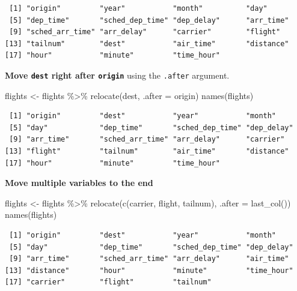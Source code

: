 \documentclass[
  letterpaper,
  DIV=11,
  numbers=noendperiod,
  oneside]{scrreprt}
\newenvironment{Shaded}{\begin{snugshade}}{\end{snugshade}}
\newcommand{\AttributeTok}[1]{\textcolor[rgb]{0.40,0.45,0.13}{#1}}
\newcommand{\FunctionTok}[1]{\textcolor[rgb]{0.28,0.35,0.67}{#1}}
\newcommand{\NormalTok}[1]{\textcolor[rgb]{0.00,0.23,0.31}{#1}}
\newcommand{\OtherTok}[1]{\textcolor[rgb]{0.00,0.23,0.31}{#1}}
\newcommand{\SpecialCharTok}[1]{\textcolor[rgb]{0.37,0.37,0.37}{#1}}
\begin{document}
\begin{verbatim}
 [1] "origin"         "year"           "month"          "day"           
 [5] "dep_time"       "sched_dep_time" "dep_delay"      "arr_time"      
 [9] "sched_arr_time" "arr_delay"      "carrier"        "flight"        
[13] "tailnum"        "dest"           "air_time"       "distance"      
[17] "hour"           "minute"         "time_hour"     
\end{verbatim}

\textbf{Move \texttt{dest} right after \texttt{origin}} using the
\texttt{.after} argument.

\begin{Shaded}
\begin{Highlighting}[]
\NormalTok{flights }\OtherTok{\textless{}{-}}\NormalTok{ flights }\SpecialCharTok{\%\textgreater{}\%} 
  \FunctionTok{relocate}\NormalTok{(dest, }\AttributeTok{.after =}\NormalTok{ origin)}
\FunctionTok{names}\NormalTok{(flights)}
\end{Highlighting}
\end{Shaded}

\begin{verbatim}
 [1] "origin"         "dest"           "year"           "month"         
 [5] "day"            "dep_time"       "sched_dep_time" "dep_delay"     
 [9] "arr_time"       "sched_arr_time" "arr_delay"      "carrier"       
[13] "flight"         "tailnum"        "air_time"       "distance"      
[17] "hour"           "minute"         "time_hour"     
\end{verbatim}

\textbf{Move multiple variables to the end}

\begin{Shaded}
\begin{Highlighting}[]
\NormalTok{flights }\OtherTok{\textless{}{-}}\NormalTok{ flights }\SpecialCharTok{\%\textgreater{}\%} 
  \FunctionTok{relocate}\NormalTok{(}\FunctionTok{c}\NormalTok{(carrier, flight, tailnum), }\AttributeTok{.after =} \FunctionTok{last\_col}\NormalTok{())}
\FunctionTok{names}\NormalTok{(flights)}
\end{Highlighting}
\end{Shaded}

\begin{verbatim}
 [1] "origin"         "dest"           "year"           "month"         
 [5] "day"            "dep_time"       "sched_dep_time" "dep_delay"     
 [9] "arr_time"       "sched_arr_time" "arr_delay"      "air_time"      
[13] "distance"       "hour"           "minute"         "time_hour"     
[17] "carrier"        "flight"         "tailnum"       
\end{verbatim}
\end{document}
